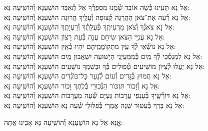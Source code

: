 \documentclass[twoside, openany, parskip=half, 11pt]{book}
\begin{document}
\begin{small}
אֵל נָא תָּעִֽינוּ כְּ֯שֶׂה אוֹבֵד שְׁ֯מֵֽנוּ מִסִּפְרְ֯ךָ אַל תְּ֯אַבֵּד \hfill הוֹשַׁעְנָא וְ֯הוֹשִֽׁיעָה נָּא: \\
אֵל נָא רְ֯עֵה אֶת־צֹאן הַהֲרֵגָה קְ֯צוּפָה וְ֯עָלֶֽיךָ הֲרוּגָה \hfill הוֹשַׁעְנָא וְ֯הוֹשִֽׁיעָה נָּא:\\
אֵל נָא צֹאנְ֯ךָ וְ֯צֹאן מַרְעִיתֶֽךָ פְּ֯עֻלָּתְ֯ךָ וְ֯רַעְיָתֶֽךָ \hfill הוֹשַׁעְנָא וְ֯הוֹשִֽׁיעָה נָּא:\\
אֵל נָא עֲנִיֵּי הַצֹּאן שִׂיחָם עֲנֵה בְּ֯עֵת רָצוֹן \hfill הוֹשַׁעְנָא וְ֯הוֹשִֽׁיעָה נָּא:\\
אֵל נָא נוֹשְׂ֯אֵי לְ֯ךָ עַֽיִן מִתְקוֹמֲמֵֽיהֶם יִהְיוּ כְ֯אַֽיִן \hfill הוֹשַׁעְנָא וְ֯הוֹשִֽׁיעָה נָּא:\\
אֵל נָא לִמְנַסְּ֯כֵי לְ֯ךָ מַֽיִם כְּ֯מִמַּעַיְנֵי הַיְשׁוּעָה יִשְׁאֲבוּן מַֽיִם \hfill הוֹשַׁעְנָא וְ֯הוֹשִֽׁיעָה נָּא:\\
אֵל נָא יַעֲלוּ לְ֯צִיּוֹן מוֹשִׁיעִים טְ֯פוּלִים בְּ֯ךָ וּבְשִׁמְךָ נוֹשָׁעִים \hfill הוֹשַׁעְנָא וְ֯הוֹשִֽׁיעָה נָּא:\\
אֵל נָא חֲמוּץ בְּ֯גָדִים זְ֯עוֹם לְ֯נַעֵר כׇּל־בּוֹגְ֯דִים \hfill הוֹשַׁעְנָא וְ֯הוֹשִֽׁיעָה נָּא:\\
אֵל נָא וְ֯זָכוֹר תִּזְכּוֹר הַנְּ֯כוּרֵי בְּ֯לֶֽתֶךְ וָכוֹר \hfill הוֹשַׁעְנָא וְ֯הוֹשִֽׁיעָה נָּא:\\
אֵל נָא דּוֹרְ֯שֶֽׁיךָ בְּ֯עַנְפֵי עֲרָבוֹת גַּעְיָם שְׁ֯עֵה מֵעֲרָבוֹת \hfill הוֹשַׁעְנָא וְ֯הוֹשִֽׁיעָה נָּא:\\
אֵל נָא בָּרֵךְ בְּ֯עִטּוּר שָׁנָה אֲמָרַי בְּ֯פִלּוּלִי שְׁ֯עֵה נָא \hfill הוֹשַׁעְנָא וְ֯הוֹשִֽׁיעָה נָּא:

\end{small}

\begin{large}
\shatzvkahal
אׇׇׇנָּא אֵל נָא הוֹשַׁעְנָא וְ֯הוֹשִֽׁיעָה נָּא אָבִֽינוּ אַֽתָּה:

\end{large}
\end{document}
